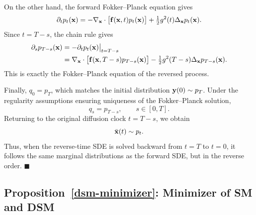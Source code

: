 On the other hand, the forward Fokker--Planck equation gives
\[
\partial_t p_t({\mathbf{x}})
=
-\nabla_{{\mathbf{x}}}\cdot
\bigl[{\mathbf{f}}({\mathbf{x}},t)p_t({\mathbf{x}})\bigr]
+
\tfrac12g^2(t)\Delta_{{\mathbf{x}}}p_t({\mathbf{x}}).
\]
Since $t=T-s$, the chain rule gives
\begin{align*}
\partial_s p_{T-s}({\mathbf{x}})
&=
-\partial_t p_t({\mathbf{x}})\big|_{t=T-s}
\\
&=
\nabla_{{\mathbf{x}}}\cdot
\bigl[
{\mathbf{f}}({\mathbf{x}},T-s)p_{T-s}({\mathbf{x}})
\bigr]
-
\tfrac12g^2(T-s)\Delta_{{\mathbf{x}}}p_{T-s}({\mathbf{x}}).
\end{align*}
This is exactly the Fokker--Planck equation of the reversed process.

Finally, $q_0=p_T$, which matches the initial distribution
${\mathbf{y}}(0)\sim p_T$. Under the regularity assumptions ensuring uniqueness of the
Fokker--Planck solution,
\[
q_s=p_{T-s},
\qquad s\in[0,T].
\]
Returning to the original diffusion clock $t=T-s$, we obtain
\[
\bar{{\mathbf{x}}}(t)\sim p_t.
\]
Thus, when the reverse-time SDE is solved backward from $t=T$ to $t=0$, it
follows the same marginal distributions as the forward SDE, but in the reverse
order.
\hfill$\blacksquare$

\subsection{Proposition~\ref{dsm-minimizer}: Minimizer of SM and DSM}\label{app-sec:min-dsm}

